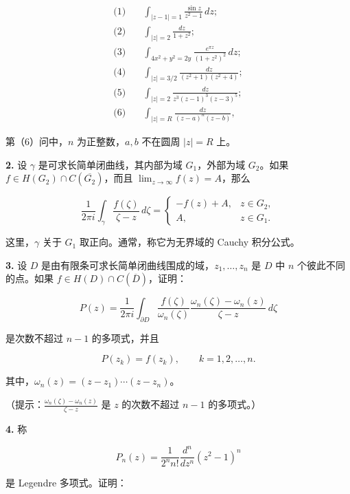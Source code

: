 \documentclass[11pt,a4paper]{article}
\begin{document}
\[
\begin{aligned}
\text{(1)}\quad&\int_{|z-1|=1}\frac{\sin z}{z^2-1}\,dz;\\
\text{(2)}\quad&\int_{|z|=2}\frac{dz}{1+z^2};\\
\text{(3)}\quad&\int_{4x^2+y^2=2y}\frac{e^{\pi z}}{(1+z^2)^2}\,dz;\\
\text{(4)}\quad&\int_{|z|=3/2}\frac{dz}{(z^2+1)(z^2+4)};\\
\text{(5)}\quad&\int_{|z|=2}\frac{dz}{z^3(z-1)^3(z-3)^5};\\
\text{(6)}\quad&\int_{|z|=R}\frac{dz}{(z-a)^n(z-b)},
\end{aligned}
\]

第（6）问中，\(n\) 为正整数，\(a,b\) 不在圆周 \(|z|=R\) 上。

\par{}
\noindent\textbf{2.} 设 \(\gamma\) 是可求长简单闭曲线，其内部为域
\(G_1\)，外部为域 \(G_2\)。如果
\(f\in H(G_2)\cap C(\overline{G_2})\)，而且
\(\lim_{z\to\infty}f(z)=A\)，那么

\[
\frac1{2\pi i}\int_\gamma\frac{f(\zeta)}{\zeta-z}\,d\zeta
=\begin{cases}-f(z)+A,&z\in G_2,\\A,&z\in G_1.\end{cases}
\]

这里，\(\gamma\) 关于 \(G_1\) 取正向。通常，称它为无界域的 Cauchy
积分公式。

\par{}
\noindent\textbf{3.} 设 \(D\)
是由有限条可求长简单闭曲线围成的域，\(z_1,\ldots,z_n\) 是 \(D\) 中 \(n\)
个彼此不同的点。如果 \(f\in H(D)\cap C(\overline D)\)，证明：

\[
P(z)=\frac1{2\pi i}\int_{\partial D}
\frac{f(\zeta)}{\omega_n(\zeta)}\frac{\omega_n(\zeta)-\omega_n(z)}{\zeta-z}\,d\zeta
\]

是次数不超过 \(n-1\) 的多项式，并且

\[
P(z_k)=f(z_k),\qquad k=1,2,\ldots,n.
\]

其中，\(\omega_n(z)=(z-z_1)\cdots(z-z_n)\)。

（提示：\(\frac{\omega_n(\zeta)-\omega_n(z)}{\zeta-z}\) 是 \(z\)
的次数不超过 \(n-1\) 的多项式。）

\par{}
\noindent\textbf{4.} 称

\[
P_n(z)=\frac1{2^n n!}\frac{d^n}{dz^n}(z^2-1)^n
\]

是 Legendre 多项式。证明：
\end{document}
